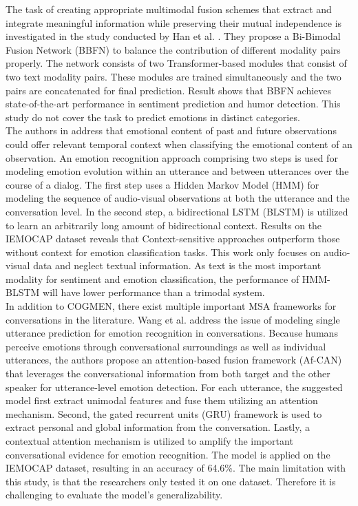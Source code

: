 The task of creating appropriate multimodal fusion schemes that extract and integrate meaningful information while preserving their mutual independence is investigated in the study conducted by Han et al. \cite{bimodal-fusion1-10.1145/3462244.3479919}. They propose a Bi-Bimodal Fusion Network (BBFN) to balance the contribution of different modality pairs properly. The network consists of two Transformer-based modules that consist of two text modality pairs. These modules are trained simultaneously and the two pairs are concatenated for final prediction. Result shows that BBFN achieves state-of-the-art performance in sentiment prediction and humor detection. This study do not cover the task to predict emotions in distinct categories.  \\

The authors in \cite{model_based_fusion6122012} address that emotional content of past and future observations could offer relevant temporal context when classifying the emotional content of an observation. An emotion recognition approach comprising two steps is used for modeling emotion evolution within an utterance and between utterances over the course of a dialog. The first step uses a Hidden Markov Model (HMM) for modeling the sequence of audio-visual observations at both the utterance and the conversation level. In the second step, a bidirectional LSTM (BLSTM) is utilized to learn an arbitrarily long amount of bidirectional context. Results on the IEMOCAP dataset reveals that Context-sensitive approaches outperform those without context for emotion classification tasks. This work only focuses on audio-visual data and neglect textual information. As text is the most important modality for sentiment and emotion classification, the performance of HMM-BLSTM will have lower performance than a trimodal system. \\

In addition to COGMEN, there exist multiple important MSA frameworks for conversations in the literature. Wang et al. \cite{Af-CAN_2021} address the issue of modeling single utterance prediction for emotion recognition in conversations. Because humans perceive emotions through conversational surroundings as well as individual utterances, the authors propose an attention-based fusion framework (Af-CAN) that leverages the conversational information from both target and the other speaker for utterance-level emotion detection. For each utterance, the suggested model first extract unimodal features and fuse them utilizing an attention mechanism. Second, the gated recurrent units (GRU) framework is used to extract personal and global information from the conversation. Lastly, a contextual attention mechanism is utilized to amplify the important conversational evidence for emotion recognition. The model is applied on the IEMOCAP dataset, resulting in an accuracy of 64.6\%. The main limitation with this study, is that the researchers only tested it on one dataset. Therefore it is challenging to evaluate the model's generalizability. \\

